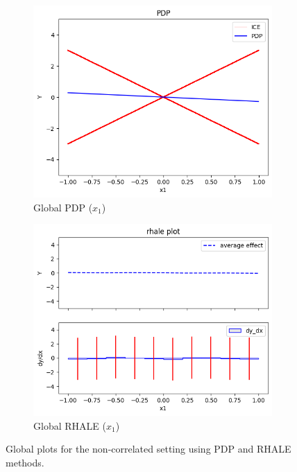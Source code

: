 \documentclass[
twocolumn,
]{ceurart}
\begin{document}
\begin{figure}[t]
    \centering
    \begin{subfigure}[b]{0.24\textwidth}
        \centering
        \includegraphics[width=\textwidth]{figures/simulation_1/uncor_global_pdp.png}
        \caption{Global PDP ($x_1$)}
        \label{subfig:global_pdp}
    \end{subfigure}
    \begin{subfigure}[b]{0.24\textwidth}
        \centering
        \includegraphics[width=\textwidth]{figures/simulation_1/uncor_global_rhale.png}
        \caption{Global RHALE ($x_1$)}
        \label{subfig:global_rhale}
    \end{subfigure}
    \caption{Global plots for the non-correlated setting using PDP and RHALE methods.}
    \label{fig:synthetic-1-uncorrelated}
  \end{figure}
\end{document}
